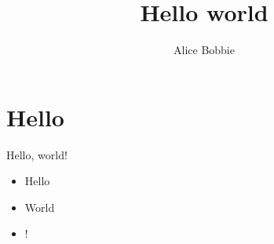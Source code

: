 \documentclass[12pt, aspectratio=43]{beamer}
\title{Hello world}
\author{Alice Bobbie}
\begin{document}
\section{Hello}
\begin{frame}{Hello, world!}
  \begin{itemize}
    \item Hello
    \item World
    \item !
  \end{itemize}
\end{frame}
\end{document}
